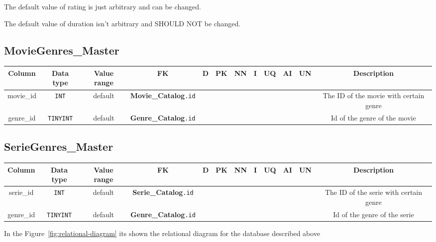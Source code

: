 \documentclass{article}
\newcommand{\dbtable}{\subsection}
\newcommand{\cmark}{\ding{51}}%
\newcommand{\mono}{\texttt}
\begin{document}
	The default value of rating is just arbitrary and can be changed.
	
	The default value of duration isn't arbitrary and SHOULD NOT be changed.

	\dbtable{MovieGenres\_Master}
	\begin{table}[h!]
		\centering
		\begin{tabular}{|c|c|c|c|c|c|c|c|c|c|c|c|}
			\toprule
			\bfseries Column & \bfseries Data type & \bfseries Value range & \bfseries FK & \bfseries D & \bfseries PK & \bfseries NN & \bfseries I & \bfseries UQ & \bfseries AI & \bfseries UN & \bfseries Description\\
			
			\midrule
			movie\_id & \mono{INT} & default & \textbf{Movie\_Catalog}\mono{.id} & & & \cmark & \cmark & & & \cmark & The ID of the movie with certain genre\\
			
			\midrule
			genre\_id & \mono{TINYINT} & default & \textbf{Genre\_Catalog}\mono{.id} & & & \cmark & \cmark & & & \cmark & Id of the genre of the movie\\
			
			\bottomrule
		\end{tabular}
	\end{table}

	\dbtable{SerieGenres\_Master}
	\begin{table}[h!]
		\centering
		\begin{tabular}{|c|c|c|c|c|c|c|c|c|c|c|c|}
			\toprule
			\bfseries Column & \bfseries Data type & \bfseries Value range & \bfseries FK & \bfseries D & \bfseries PK & \bfseries NN & \bfseries I & \bfseries UQ & \bfseries AI & \bfseries UN & \bfseries Description\\
			
			\midrule
			serie\_id & \mono{INT} & default & \textbf{Serie\_Catalog}\mono{.id} & & & \cmark & \cmark & & & \cmark & The ID of the serie with certain genre\\
			
			\midrule
			genre\_id & \mono{TINYINT} & default & \textbf{Genre\_Catalog}\mono{.id} & & & \cmark & \cmark & & & \cmark & Id of the genre of the serie\\
			
			\bottomrule
		\end{tabular}
	\end{table}

	In the Figure~\ref{fig:relational-diagram} its shown the relational diagram for the database described above
\end{document}
